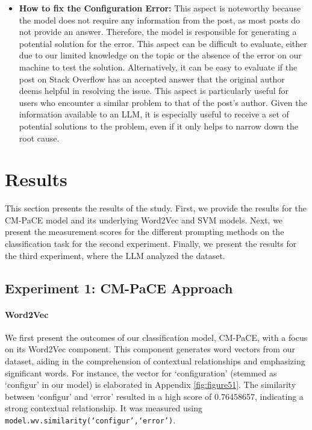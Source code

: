 \documentclass[english,bachelor]{swsLeipzig}
\begin{document}
\begin{itemize}
  \item \textbf{How to fix the Configuration Error:} This aspect is noteworthy because the model does not require any information from the post, as most posts do not provide an answer. Therefore, the model is responsible for generating a potential solution for the error. This aspect can be difficult to evaluate, either due to our limited knowledge on the topic or the absence of the error on our machine to test the solution. Alternatively, it can be easy to evaluate if the post on Stack Overflow has an accepted answer that the original author deems helpful in resolving the issue. This aspect is particularly useful for users who encounter a similar problem to that of the post's author. Given the information available to an LLM, it is especially useful to receive a set of potential solutions to the problem, even if it only helps to narrow down the root cause.
\end{itemize}

\chapter{Results}\label{results}

This section presents the results of the study. First, we provide the results for the CM-PaCE model and its underlying Word2Vec and SVM models. Next, we present the measurement scores for the different prompting methods on the classification task for the second experiment. Finally, we present the results for the third experiment, where the LLM analyzed the dataset.

\section{Experiment 1: CM-PaCE Approach}

\subsubsection{Word2Vec}

We first present the outcomes of our classification model, CM-PaCE, with a focus on its Word2Vec component. This component generates word vectors from our dataset, aiding in the comprehension of contextual relationships and emphasizing significant words. For instance, the vector for `configuration' (stemmed as `configur' in our model) is elaborated in Appendix 
\ref{fig:figure51}. The similarity between `configur' and `error' resulted in a high score of 0.76458657, indicating a strong contextual relationship. It was measured using \texttt{model.wv.similarity(`configur',`error')}.
\end{document}

